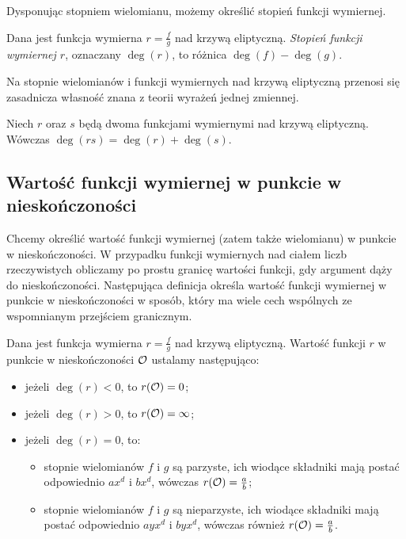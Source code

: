 Dysponując stopniem wielomianu, możemy określić stopień funkcji wymiernej.

\begin{definition}
Dana jest funkcja wymierna $r = \frac{f}{g}$ nad krzywą eliptyczną.
\emph{Stopień funkcji wymiernej $r$},
oznaczany $\deg(r)$,
to różnica $\deg(f) - \deg(g)$.
\end{definition}

Na stopnie wielomianów i funkcji wymiernych nad krzywą eliptyczną
przenosi się zasadnicza własność znana z teorii wyrażeń jednej zmiennej.

\begin{theorem}
Niech $r$ oraz $s$ będą dwoma funkcjami wymiernymi nad krzywą eliptyczną.
Wówczas $\deg(rs) = \deg(r) + \deg(s)$.
\end{theorem}

\subsection*{Wartość funkcji wymiernej w punkcie w nieskończoności}

Chcemy określić wartość funkcji wymiernej (zatem także wielomianu)
w punkcie w nieskończoności.
W przypadku funkcji wymiernych nad ciałem liczb rzeczywistych
obliczamy po prostu granicę wartości funkcji,
gdy argument dąży do nieskończoności.
Następująca definicja określa
wartość funkcji wymiernej w punkcie w nieskończoności w sposób,
który ma wiele cech wspólnych ze wspomnianym przejściem granicznym.

\begin{definition}
Dana jest funkcja wymierna $r = \frac{f}{g}$ nad krzywą eliptyczną.
Wartość funkcji $r$ w punkcie w nieskończoności $\mathcal{O}$
ustalamy następująco:
\begin{itemize}
\item jeżeli $\deg(r) < 0$, to $r(\mathcal{O}) = 0$;
\item jeżeli $\deg(r) > 0$, to $r(\mathcal{O}) = \infty$;
\item jeżeli $\deg(r) = 0$, to:
\begin{itemize}
\item stopnie wielomianów $f$ i $g$ są parzyste,
ich wiodące składniki mają postać odpowiednio $ax^d$ i $bx^d$,
wówczas $r(\mathcal{O}) = \frac{a}{b}$;
\item stopnie wielomianów $f$ i $g$ są nieparzyste,
ich wiodące składniki mają postać odpowiednio $ayx^d$ i $byx^d$,
wówczas również $r(\mathcal{O}) = \frac{a}{b}$.
\end{itemize}
\end{itemize}
\end{definition}

